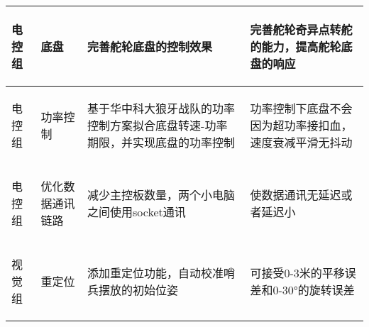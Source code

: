 \begin{longtable}{ p{1.5cm} | p{3cm} | p{6cm} | p{4.3cm} |}
    \hline

       \begin{center}
           电控组
       \end{center} &
       \begin{center}
           底盘
       \end{center} &
       \begin{center}
           完善舵轮底盘的控制效果
       \end{center} &
       \begin{center}
           完善舵轮奇异点转舵的能力，提高舵轮底盘的响应
       \end{center} \\
        
    \hline

       \begin{center}
           电控组
       \end{center} &
       \begin{center}
           功率控制
       \end{center} &
       \begin{center}
           基于华中科大狼牙战队的功率控制方案拟合底盘转速-功率期限，并实现底盘的功率控制
       \end{center} &
       \begin{center}
           功率控制下底盘不会因为超功率接扣血，速度衰减平滑无抖动
       \end{center} \\

    \hline

       \begin{center}
           电控组
       \end{center} &
       \begin{center}
           优化数据通讯链路
       \end{center} &
       \begin{center}
           减少主控板数量，两个小电脑之间使用socket通讯
       \end{center} &
       \begin{center}
           使数据通讯无延迟或者延迟小
       \end{center} \\

    \hline

       \begin{center}
           视觉组
       \end{center} &
       \begin{center}
           重定位
       \end{center} &
       \begin{center}
           添加重定位功能，自动校准哨兵摆放的初始位姿
       \end{center} &
       \begin{center}
           可接受0-3米的平移误差和0-30°的旋转误差
       \end{center} \\


\end{longtable}
